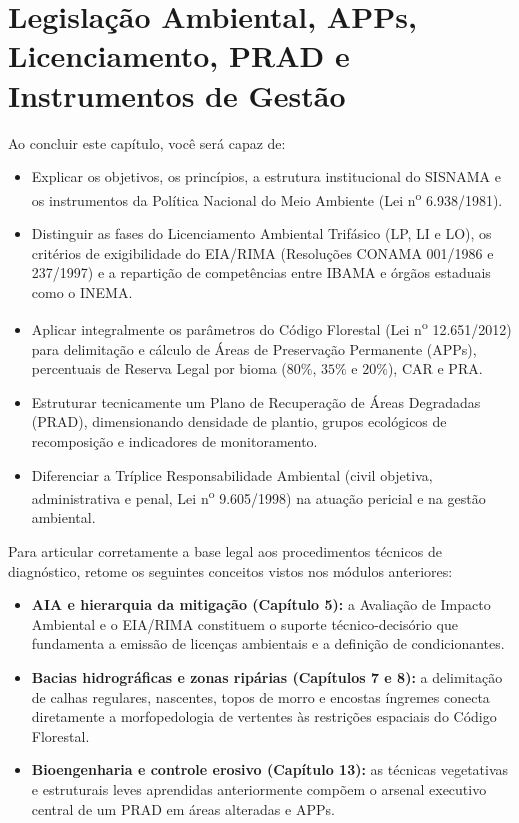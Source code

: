 \chapter{Legislação Ambiental, APPs, Licenciamento, PRAD e Instrumentos de Gestão}
\label{cap:legislacao_apps_licenciamento_prad}

\noindent\tagPratica
\vspace{4pt}

\begin{capObjetivos}
Ao concluir este capítulo, você será capaz de:
\begin{itemize}[leftmargin=1.5em, itemsep=2.5pt]
  \item Explicar os objetivos, os princípios, a estrutura institucional do SISNAMA e os instrumentos da Política Nacional do Meio Ambiente (Lei n\textsuperscript{o} 6.938/1981).
  \item Distinguir as fases do Licenciamento Ambiental Trifásico (LP, LI e LO), os critérios de exigibilidade do EIA/RIMA (Resoluções CONAMA 001/1986 e 237/1997) e a repartição de competências entre IBAMA e órgãos estaduais como o INEMA.
  \item Aplicar integralmente os parâmetros do Código Florestal (Lei n\textsuperscript{o} 12.651/2012) para delimitação e cálculo de Áreas de Preservação Permanente (APPs), percentuais de Reserva Legal por bioma ($80\%$, $35\%$ e $20\%$), CAR e PRA.
  \item Estruturar tecnicamente um Plano de Recuperação de Áreas Degradadas (PRAD), dimensionando densidade de plantio, grupos ecológicos de recomposição e indicadores de monitoramento.
  \item Diferenciar a Tríplice Responsabilidade Ambiental (civil objetiva, administrativa e penal, Lei n\textsuperscript{o} 9.605/1998) na atuação pericial e na gestão ambiental.
\end{itemize}
\end{capObjetivos}

\begin{capRevisao}
Para articular corretamente a base legal aos procedimentos técnicos de diagnóstico, retome os seguintes conceitos vistos nos módulos anteriores:
\begin{itemize}[leftmargin=1.5em, itemsep=2.5pt]
  \item \textbf{AIA e hierarquia da mitigação (Capítulo 5):} a Avaliação de Impacto Ambiental e o EIA/RIMA constituem o suporte técnico-decisório que fundamenta a emissão de licenças ambientais e a definição de condicionantes.
  \item \textbf{Bacias hidrográficas e zonas ripárias (Capítulos 7 e 8):} a delimitação de calhas regulares, nascentes, topos de morro e encostas íngremes conecta diretamente a morfopedologia de vertentes às restrições espaciais do Código Florestal.
  \item \textbf{Bioengenharia e controle erosivo (Capítulo 13):} as técnicas vegetativas e estruturais leves aprendidas anteriormente compõem o arsenal executivo central de um PRAD em áreas alteradas e APPs.
\end{itemize}
\end{capRevisao}

